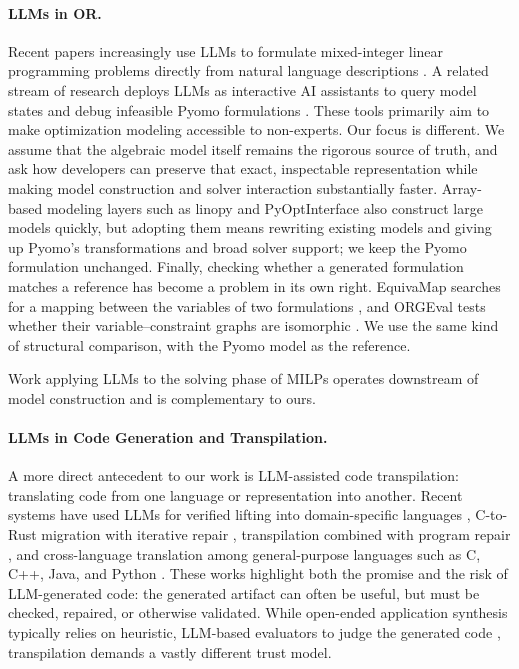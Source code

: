 \documentclass[runningheads]{llncs}
\begin{document}
\paragraph{LLMs in OR.} Recent papers increasingly use LLMs to formulate mixed-integer linear programming problems directly from natural language descriptions \cite{ramamonjison2023nl4opt,ramamonjison2022augmenting,yang2025optibench,ahmaditeshnizi2024optimus-2,ahmaditeshnizi2024optimus-1,xiao2024chain,li2026solverllm,huang2025orlm}. A related stream of research deploys LLMs as interactive AI assistants to query model states \cite{li2023large} and debug infeasible Pyomo formulations \cite{chen2024diagnosing}. These tools primarily aim to make optimization modeling accessible to non-experts. Our focus is different. We assume that the algebraic model itself remains the rigorous source of truth, and ask how developers can preserve that exact, inspectable representation while making model construction and solver interaction substantially faster. Array-based modeling layers such as linopy \cite{hofmann2023linopy} and PyOptInterface \cite{yang2024pyoptinterface} also construct large models quickly, but adopting them means rewriting existing models and giving up Pyomo's transformations and broad solver support; we keep the Pyomo formulation unchanged. Finally, checking whether a generated formulation matches a reference has become a problem in its own right. EquivaMap searches for a mapping between the variables of two formulations \cite{zhai2025equivamap}, and ORGEval tests whether their variable--constraint graphs are isomorphic \cite{wang2025orgeval}. We use the same kind of structural comparison, with the Pyomo model as the reference.

Work applying LLMs to the solving phase of MILPs \cite{iklassov2024self,sun2026co,ye2025large,lawless2025llms} operates downstream of model construction and is complementary to ours.

\paragraph{LLMs in Code Generation and Transpilation.} A more direct antecedent to our work is LLM-assisted code transpilation: translating code from one language or representation into another. Recent systems have used LLMs for verified lifting into domain-specific languages \cite{bhatia2024verified}, C-to-Rust migration with iterative repair \cite{farrukh2026safetrans}, transpilation combined with program repair \cite{ramos2024batfix}, and cross-language translation among general-purpose languages such as C, C++, Java, and Python \cite{rai2024cross}. These works highlight both the promise and the risk of LLM-generated code: the generated artifact can often be useful, but must be checked, repaired, or otherwise validated. While open-ended application synthesis typically relies on heuristic, LLM-based evaluators to judge the generated code \cite{cheng2026apeiron}, transpilation demands a vastly different trust model.
\end{document}
